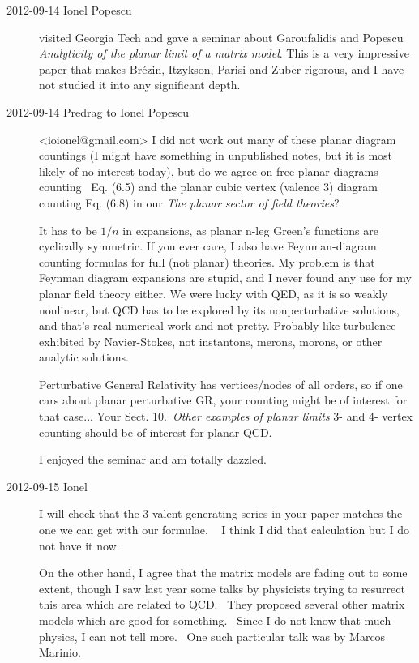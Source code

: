 \begin{description}
\item[2012-09-14 Ionel Popescu] visited Georgia Tech and gave a seminar
about Garoufalidis and Popescu {\em Analyticity of the
planar limit of a matrix model}. This is a very impressive paper that
makes Br{\'{e}}zin, Itzykson, Parisi and Zuber rigorous, and I
have not studied it into any significant depth.

\item[2012-09-14 Predrag to Ionel Popescu] <ioionel@gmail.com>
I did not work out many of these planar diagram countings (I might have
something in unpublished notes, but it is most likely of no interest
today), but do we agree on free planar diagrams counting  Eq. (6.5) and the
planar cubic vertex (valence 3) diagram counting Eq. (6.8)
in our 
{{\em The planar sector of field theories}}?

It has to be $1/n$ in expansions, as planar n-leg Green's functions are
cyclically symmetric. If you ever care, I also have Feynman-diagram
counting formulas for full (not planar) theories. My problem is that Feynman
diagram expansions are
{stupid},
and I never found any use for my planar field
theory
{either}.
We were lucky with QED, as it is so weakly nonlinear, but QCD has
to be explored by its nonperturbative solutions, and that's real numerical
work and not pretty. Probably like turbulence exhibited by Navier-Stokes,
not instantons, merons, morons, or other analytic solutions.

Perturbative General Relativity has vertices/nodes of all orders, so if one
cars about planar perturbative GR, your counting might be of interest for
that case... Your Sect. 10.~{\em Other examples of planar limits} 3- and 4-
vertex counting should be of interest for planar QCD.

I enjoyed the seminar and am totally dazzled.

\item[2012-09-15 Ionel]
I will check that the 3-valent generating series in your paper matches
the one we can get with our formulae.   I think I did that calculation
but I do not have it now.

On the other hand, I agree that the matrix models are fading out to some
extent, though I saw last year some talks by physicists trying to resurrect
this area which are related to QCD.  They proposed several other matrix
models which are good for something.  Since I do not know that much
physics, I can not tell more.  One such particular talk was by Marcos
Marinio.


\end{description}
